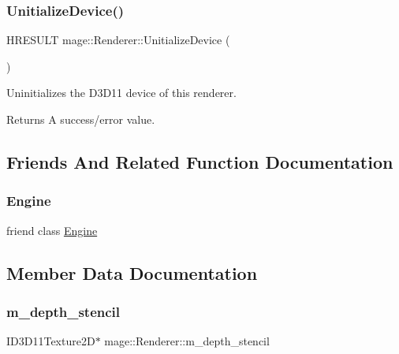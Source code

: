 \subsubsection{\texorpdfstring{Unitialize\+Device()}{UnitializeDevice()}}
{\footnotesize\ttfamily H\+R\+E\+S\+U\+LT mage\+::\+Renderer\+::\+Unitialize\+Device (\begin{DoxyParamCaption}{ }\end{DoxyParamCaption})\hspace{0.3cm}{\ttfamily [protected]}}

Uninitializes the D3\+D11 device of this renderer.

\begin{DoxyReturn}{Returns}
A success/error value. 
\end{DoxyReturn}


\subsection{Friends And Related Function Documentation}
\hypertarget{classmage_1_1_renderer_a3e1914489e4bed4f9f23cdeab34a43dc}{}\label{classmage_1_1_renderer_a3e1914489e4bed4f9f23cdeab34a43dc} 
\subsubsection{\texorpdfstring{Engine}{Engine}}
{\footnotesize\ttfamily friend class \hyperlink{classmage_1_1_engine}{Engine}\hspace{0.3cm}{\ttfamily [friend]}}



\subsection{Member Data Documentation}
\hypertarget{classmage_1_1_renderer_a1c19b2fb0347ab2e93f19d7a9d53a947}{}\label{classmage_1_1_renderer_a1c19b2fb0347ab2e93f19d7a9d53a947} 
\subsubsection{\texorpdfstring{m\+\_\+depth\+\_\+stencil}{m\_depth\_stencil}}
{\footnotesize\ttfamily I\+D3\+D11\+Texture2D$\ast$ mage\+::\+Renderer\+::m\+\_\+depth\+\_\+stencil\hspace{0.3cm}{\ttfamily [protected]}}

